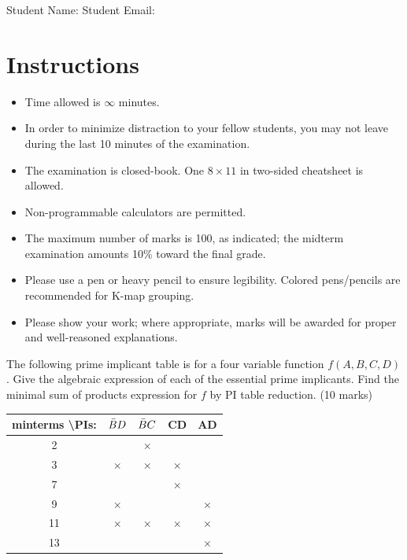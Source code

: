 \maketitle

Student Name: \hfill Student Email: \hspace{10em}
\section{Instructions}
\begin{itemize}
  \item Time allowed is $\infty$ minutes.
  \item In order to minimize distraction to your fellow students, you may not leave
  during the last 10 minutes of the examination.
  \item The examination is closed-book. One $8\times11$ in two-sided cheatsheet is allowed.
  \item Non-programmable calculators are permitted.
  \item The maximum number of marks is 100, as indicated; the midterm examination
  amounts 10\% toward the final grade.
  \item Please use a pen or heavy pencil to ensure legibility. Colored
    pens/pencils are recommended for K-map grouping.
  \item Please show your work; where appropriate, marks will be awarded for proper and well-reasoned explanations.
\end{itemize}
\newpage

\begin{prob}
  The following prime implicant table is for a four variable function $f(A, B,
  C, D)$.
  Give the algebraic expression of each of the essential prime implicants. Find
  the minimal sum of products expression for $f$ by PI table reduction. (10 marks)
  \\
  \begin{tabular}{ccccc}
    \toprule
    minterms \textbackslash PIs: & $\bar{B} D$ & $\bar{B} C$ & CD & AD  \\
    \midrule
    2  &   & $\times$ & & \\
    3  & $\times$ & $\times$ & $\times$ & \\ 
    7  &  & & $\times$ & \\ 
    9  & $\times$ & & & $\times$ \\ 
    11 & $\times$ & $\times$ & $\times$ & $\times$ \\ 
    13 &  & & & $\times$ \\
    \bottomrule
  \end{tabular}\\
\end{prob}
\newpage

